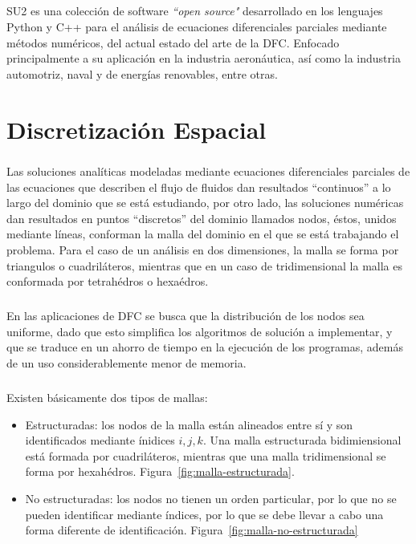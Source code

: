 \documentclass[letterpaper, openright, 12pt]{book}
\begin{document}
            \paragraph*{}
            SU2 es una colección de software \textit{``open source"}
            desarrollado en los lenguajes Python y C++ para el análisis de
            ecuaciones diferenciales parciales mediante métodos numéricos,
            del actual estado del arte de la DFC\@. Enfocado principalmente a
            su aplicación en la industria aeronáutica, así como la industria
            automotriz, naval y de energías renovables, entre otras.\cite{SU2}
%
%
%
%
%

%
%
%
%
\chapter{Discretización Espacial} \label{chap:discretizacion-espacial}
    \paragraph*{}
    Las soluciones analíticas modeladas mediante ecuaciones diferenciales
    parciales de las ecuaciones que describen el flujo de fluidos dan resultados
    ``continuos'' a lo largo del dominio que se está estudiando, por otro lado,
    las soluciones numéricas  dan resultados en puntos ``discretos'' del dominio
    llamados nodos, éstos, unidos mediante líneas, conforman la malla del
    dominio en el que se está trabajando el problema. Para el caso de un
    análisis en dos dimensiones, la malla se forma por triangulos o
    cuadriláteros, mientras que en un caso de tridimensional la malla es
    conformada por tetrahédros o hexaédros.

    \paragraph*{}
    En las aplicaciones de DFC se busca que la distribución de los nodos sea
    uniforme, dado que esto simplifica los algoritmos de solución a implementar,
    y que se traduce en un ahorro de tiempo en la ejecución de los programas,
    además de un uso considerablemente menor de memoria.

    \paragraph*{}
    Existen básicamente dos tipos de mallas:
    \begin{itemize}
    \item Estructuradas: los nodos de la malla están alineados entre sí y
      son identificados mediante ínidices $i, j, k$. Una malla estructurada
      bidimiensional está formada por cuadriláteros, mientras que una malla
      tridimensional se forma por hexahédros. Figura~\ref{fig:malla-estructurada}.
    \item No estructuradas: los nodos no tienen un orden particular, por lo
      que no se pueden identificar mediante índices, por lo que se debe llevar a
      cabo una forma diferente de identificación. Figura~\ref{fig:malla-no-estructurada}
    \end{itemize}
\end{document}
